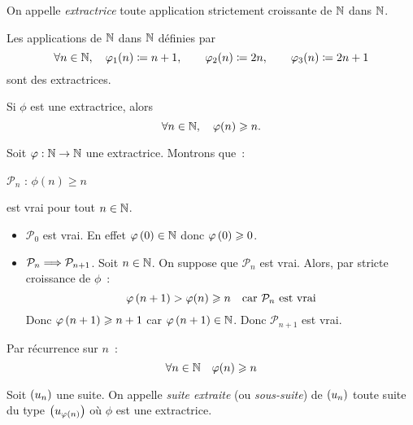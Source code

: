 \documentclass{magnolia}
\begin{document}
\begin{definition}[utile=-3]
On appelle \emph{extractrice} toute application strictement croissante de $\mathbb{N}$ dans
$\mathbb{N}$.  
\end{definition}

\begin{remarqueUnique}
\remarque Les applications de $\mathbb{N}$ dans $\mathbb{N}$ définies par
  \[\forall n\in\mathbb{N} ,\quad \varphi_1(n)\coloneqq n+1, \qquad \varphi_2(n)\coloneqq 2n, \qquad
    \varphi_3(n)\coloneqq 2n+1\]
  sont des extractrices.
\end{remarqueUnique}


\begin{proposition}[utile=-3]
Si $\phi$ est une extractrice, alors
\[\forall n\in\mathbb{N} ,\quad \varphi(n)\geqslant n.\]
\end{proposition}

\begin{preuve}
Soit $\varphi:\mathbb{N}\to\mathbb{N}$ une extractrice. Montrons que~:
\begin{center}
$\mathcal{P}_n$ : \og $\phi(n)\geq n$ \fg
\end{center}
est vrai pour tout $n\in\mathbb{N}$.
\begin{itemize}
\item $\mathcal{P}_0$ est vrai. En effet $\varphi\left(0\right)\in\mathbb{N}$ donc
  $\varphi\left(0\right)\geqslant 0$.
\item $\mathcal{P}_n\Longrightarrow\mathcal{P}_{n+1}$. Soit $n\in\mathbb{N}$. On suppose que
  $\mathcal{P}_n$ est vrai. Alors, par stricte croissance de $\phi$~:
  \[\varphi\left(n+1\right)>\varphi(n)\geqslant n \quad \text{car $\mathcal{P}_n$ est vrai}\]
  Donc $\varphi\left(n+1\right)\geqslant n+1$ car $\varphi\left(n+1\right)\in\mathbb{N}$. Donc
  $\mathcal{P}_{n+1}$ est vrai.
\end{itemize}
Par récurrence sur $n$~:
\[\forall n\in\mathbb{N} \quad \varphi(n)\geqslant n\]
\end{preuve}

\begin{definition}[utile=-3]
Soit $\left(u_n\right)$ une suite. On appelle \emph{suite extraite} (ou \emph{sous-suite}) de
$\left(u_n\right)$ toute suite du type $\left(u_{\varphi(n)}\right)$ où $\phi$ est une extractrice.
\end{definition}
\end{document}
